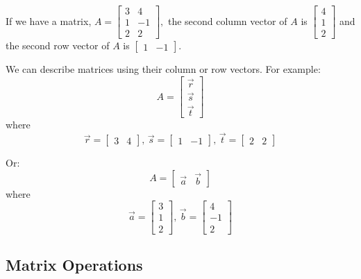 \documentclass[../main.tex]{subfiles}
\begin{document}
\begin{example}[]
    If we have a matrix, \( A = \begin{bmatrix}
        3 & 4 \\
        1 & -1 \\
        2 & 2 
    \end{bmatrix}, \)
    the second column vector of \( A \) is \( \begin{bmatrix}
        4 \\
        1 \\
        2
    \end{bmatrix} \)
    and the second row vector of \( A \) is \( \begin{bmatrix}
        1 & -1
    \end{bmatrix} \).

    We can describe matrices using their column or row vectors. For example:
    \[ A = \begin{bmatrix}
        \vec{r} \\
        \vec{s} \\
        \vec{t}
    \end{bmatrix} \]
    where \[ \vec{r} = \begin{bmatrix}
        3 & 4
    \end{bmatrix}, \, \vec{s} = \begin{bmatrix}
        1 & -1
    \end{bmatrix}, \, \vec{t} = \begin{bmatrix}
        2 & 2
    \end{bmatrix} \]

    Or: \[ A = \begin{bmatrix}
        \vec{a} & \vec{b}
    \end{bmatrix} \]
    where \[ \vec{a} = \begin{bmatrix}
        3 \\
        1 \\
        2
    \end{bmatrix}, \, \vec{b} = \begin{bmatrix}
        4 \\
        -1 \\
        2
    \end{bmatrix} \]
\end{example}


\subsection{Matrix Operations}
\end{document}
